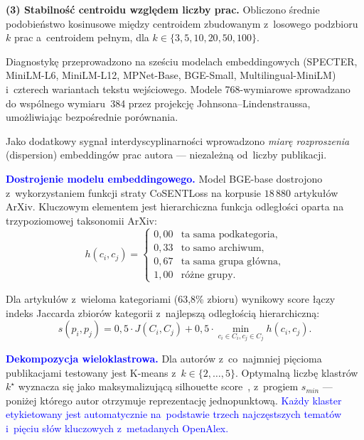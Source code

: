 \documentclass[a4paper,11pt,twocolumn]{article}
\newcommand{\hl}[1]{\textcolor{blue}{#1}}
\begin{document}
\textbf{(3) Stabilność centroidu względem liczby prac.}
Obliczono średnie podobieństwo kosinusowe między centroidem zbudowanym
z~losowego podzbioru $k$ prac a~centroidem pełnym, dla
$k \in \{3, 5, 10, 20, 50, 100\}$.

Diagnostykę przeprowadzono na sześciu modelach embeddingowych (SPECTER,
MiniLM-L6, MiniLM-L12, MPNet-Base, BGE-Small, Multilingual-MiniLM)
i~czterech wariantach tekstu wejściowego. Modele 768-wymiarowe
sprowadzano do wspólnego wymiaru~384 przez projekcję
Johnsona--Lindenstraussa, umożliwiając bezpośrednie porównania.

Jako dodatkowy sygnał interdyscyplinarności wprowadzono \emph{miarę
rozproszenia} (dispersion) embeddingów prac autora --- niezależną
od~liczby publikacji.

\hl{\textbf{Dostrojenie modelu embeddingowego.}}
\label{sec:finetune}
Model BGE-base dostrojono z~wykorzystaniem funkcji straty CoSENTLoss
na korpusie $18\,880$ artykułów ArXiv. Kluczowym elementem jest
hierarchiczna funkcja odległości oparta na trzypoziomowej taksonomii
ArXiv:
\begin{equation}
  h(c_i, c_j) = \begin{cases}
    0{,}00 & \text{ta sama podkategoria,} \\
    0{,}33 & \text{to samo archiwum,} \\
    0{,}67 & \text{ta sama grupa główna,} \\
    1{,}00 & \text{różne grupy.}
  \end{cases}
  \label{eq:hierarchy}
\end{equation}

Dla artykułów z~wieloma kategoriami (63,8\% zbioru) wynikowy score
łączy indeks Jaccarda zbiorów kategorii z~najlepszą odległością
hierarchiczną:
\begin{equation}
  s(p_i, p_j) = 0{,}5 \cdot J(C_i, C_j) + 0{,}5 \cdot
  \min_{c_i \in C_i, c_j \in C_j} h(c_i, c_j).
  \label{eq:score}
\end{equation}

\hl{\textbf{Dekompozycja wieloklastrowa.}}
Dla autorów z~co~najmniej pięcioma publikacjami testowany jest K-means
z~$k \in \{2, \ldots, 5\}$. Optymalną liczbę klastrów $k^\star$
wyznacza się jako maksymalizującą silhouette score~\cite{rousseeuw1987},
z~progiem $s_{min}$ --- poniżej którego autor otrzymuje reprezentację
jednopunktową. \hl{Każdy klaster etykietowany jest automatycznie
na~podstawie trzech najczęstszych tematów i~pięciu słów kluczowych
z~metadanych OpenAlex.}
\end{document}
